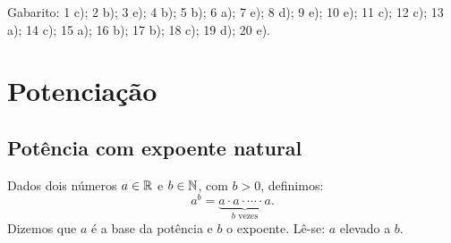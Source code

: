   Gabarito: 1 c); 2 b); 3 e); 4 b); 5 b); 6 a); 7 e); 8 d); 9 e); 10 e); 11 c); 12 c); 13 a); 14 c); 15 a); 16 b); 17 b); 18 c); 19 d); 20 e).

 \chapter{Potenciação}

 \section{Potência com expoente natural}

 \vskip0.3cm

 \colorbox{azul}{
 \begin{minipage}{0.9\linewidth}
 \begin{center}
  Dados dois números $a \in \mathbb{R}$ e $b \in \mathbb{N}$, com $b > 0$, definimos:
 \[a^b= \underbrace{a \cdot a \cdot \cdots \cdot a}_{b \text{ vezes}} .\]
  Dizemos que $a$ é a base da potência e $b$ o expoente. Lê-se: $a$ elevado a $b$.
 \end{center}
 \end{minipage}}

 \vskip0.3cm

